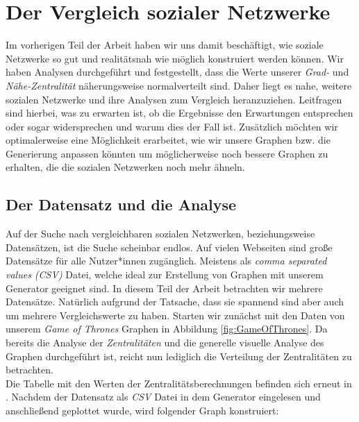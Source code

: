 \chapter{Der Vergleich sozialer Netzwerke}\label{ch:vergleich}

Im vorherigen Teil der Arbeit haben wir uns damit beschäftigt, wie soziale Netzwerke so gut und realitätsnah wie möglich konstruiert werden können. Wir haben Analysen durchgeführt und festgestellt, dass die Werte unserer \textit{Grad-} und \textit{Nähe-Zentralität} näherungsweise normalverteilt sind. Daher liegt es nahe, weitere sozialen Netzwerke und ihre Analysen zum Vergleich heranzuziehen. Leitfragen sind hierbei, was zu erwarten ist, ob die Ergebnisse den Erwartungen entsprechen oder sogar widersprechen und warum dies der Fall ist. Zusätzlich möchten wir optimalerweise eine Möglichkeit erarbeitet, wie wir unsere Graphen bzw. die Generierung anpassen könnten um möglicherweise noch bessere Graphen zu erhalten, die die sozialen Netzwerken noch mehr ähneln. 

\section{Der Datensatz und die Analyse}
Auf der Suche nach vergleichbaren sozialen Netzwerken, beziehungsweise Datensätzen, ist die Suche scheinbar endlos. Auf vielen Webseiten sind große Datensätze für alle Nutzer*innen zugänglich. Meistens als \textit{comma separated values (CSV)} Datei, welche ideal zur Erstellung von Graphen mit unserem Generator geeignet sind. In diesem Teil der Arbeit betrachten wir mehrere Datensätze. Natürlich aufgrund der Tatsache, dass sie spannend sind aber auch um mehrere Vergleichswerte zu haben. Starten wir zunächst mit den Daten \cite{GOT} von unserem \textit{Game of Thrones} Graphen in Abbildung \ref{fig:GameOfThrones}. Da bereits die Analyse der \textit{Zentralitäten} und die generelle visuelle Analyse des Graphen durchgeführt ist, reicht nun lediglich die Verteilung der Zentralitäten zu betrachten.\\
Die Tabelle mit den Werten der Zentralitätsberechnungen befinden sich erneut in \cite{TZ}. Nachdem der Datensatz als \textit{CSV} Datei in dem Generator eingelesen und anschließend geplottet wurde, wird folgender Graph konstruiert:

